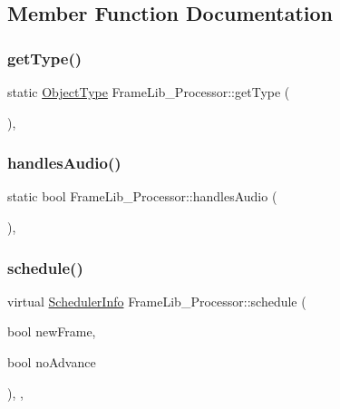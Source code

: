 \subsection{Member Function Documentation}
\mbox{\label{class_frame_lib___processor_a9cf7b310f4d1ca8843b201d692fcf544}} 
\subsubsection{\texorpdfstring{get\+Type()}{getType()}}
{\footnotesize\ttfamily static \hyperlink{_frame_lib___types_8h_a842c5e2e69277690b064bf363c017980}{Object\+Type} Frame\+Lib\+\_\+\+Processor\+::get\+Type (\begin{DoxyParamCaption}{ }\end{DoxyParamCaption})\hspace{0.3cm}{\ttfamily [inline]}, {\ttfamily [static]}}

\mbox{\label{class_frame_lib___processor_a77869c3007f363ce914d9e0073953660}} 
\subsubsection{\texorpdfstring{handles\+Audio()}{handlesAudio()}}
{\footnotesize\ttfamily static bool Frame\+Lib\+\_\+\+Processor\+::handles\+Audio (\begin{DoxyParamCaption}{ }\end{DoxyParamCaption})\hspace{0.3cm}{\ttfamily [inline]}, {\ttfamily [static]}}

\mbox{\label{class_frame_lib___processor_a2487e6433f6a5e79014664a0500ccc24}} 
\subsubsection{\texorpdfstring{schedule()}{schedule()}}
{\footnotesize\ttfamily virtual \hyperlink{struct_frame_lib___d_s_p_1_1_scheduler_info}{Scheduler\+Info} Frame\+Lib\+\_\+\+Processor\+::schedule (\begin{DoxyParamCaption}\item[{bool}]{new\+Frame,  }\item[{bool}]{no\+Advance }\end{DoxyParamCaption})\hspace{0.3cm}{\ttfamily [inline]}, {\ttfamily [protected]}, {\ttfamily [virtual]}}



